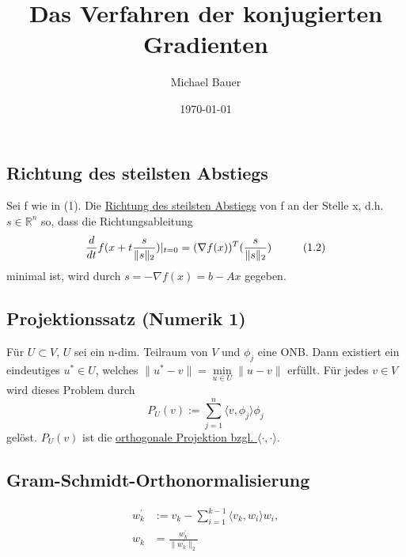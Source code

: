 \documentclass{article}
\title{Das Verfahren der konjugierten Gradienten}
\author{Michael Bauer}
\date{\today{}}
\begin{document}
\maketitle
\Large


\section*{}

\subsection*{Richtung des steilsten Abstiegs}
Sei f wie in (1). Die \underline{Richtung des steilsten Abstiegs} von f an der Stelle x, d.h. $s\in\mathbb{R}^{n}$ so, dass die Richtungsableitung
$$\frac d {dt} f(x+t\frac s {\|s\|_{2}})|_{t=0} = (\nabla f(x))^{T} (\frac s {\|s\|_{2}}) \hspace{10mm}(1.2)$$
minimal ist, wird durch $s = -\nabla f(x) = b - Ax$ gegeben.

\subsection*{Projektionssatz (Numerik 1)}
Für $U \subset V$, $U$ sei ein n-dim. Teilraum von $V$ und $\phi_{j}$ eine ONB. Dann existiert ein eindeutiges $u^{*} \in U$, welches $\|u^{*} - v\| = \underset{u \in U}{\min} \|u - v\|$ erfüllt. Für jedes $v \in V$ wird dieses Problem durch
$$P_{U}(v) := \sum_{j=1}^{n} \langle v, \phi_{j} \rangle \phi_{j}$$
gelöst. $P_{U}(v)$ ist die \underline{orthogonale Projektion bzgl. $\langle \cdot, \cdot \rangle$}.

\subsection*{Gram-Schmidt-Orthonormalisierung}
\begin{align*}
	w_{k}^{'} &:= v_{k} - \sum_{i=1}^{k-1} \langle v_{k}, w_{i} \rangle w_{i}, \\
	w_{k} &= \frac {w_{k}^{'}} {\|w_{k}^{'}\|_{2}}
\end{align*}
\end{document}
